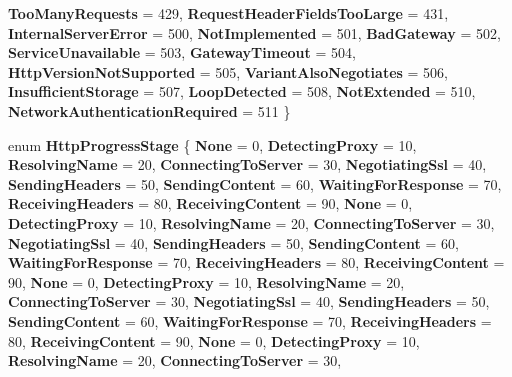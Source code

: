 \begin{DoxyCompactItemize}
{\bfseries Too\+Many\+Requests} = 429, 
{\bfseries Request\+Header\+Fields\+Too\+Large} = 431, 
{\bfseries Internal\+Server\+Error} = 500, 
\newline
{\bfseries Not\+Implemented} = 501, 
{\bfseries Bad\+Gateway} = 502, 
{\bfseries Service\+Unavailable} = 503, 
{\bfseries Gateway\+Timeout} = 504, 
\newline
{\bfseries Http\+Version\+Not\+Supported} = 505, 
{\bfseries Variant\+Also\+Negotiates} = 506, 
{\bfseries Insufficient\+Storage} = 507, 
{\bfseries Loop\+Detected} = 508, 
\newline
{\bfseries Not\+Extended} = 510, 
{\bfseries Network\+Authentication\+Required} = 511
 \}
\item 
\mbox{\label{namespace_windows_1_1_web_1_1_http_aa0f55350f3367ec69564a41407e44b3b}} 
enum {\bfseries Http\+Progress\+Stage} \{ \newline
{\bfseries None} = 0, 
{\bfseries Detecting\+Proxy} = 10, 
{\bfseries Resolving\+Name} = 20, 
{\bfseries Connecting\+To\+Server} = 30, 
\newline
{\bfseries Negotiating\+Ssl} = 40, 
{\bfseries Sending\+Headers} = 50, 
{\bfseries Sending\+Content} = 60, 
{\bfseries Waiting\+For\+Response} = 70, 
\newline
{\bfseries Receiving\+Headers} = 80, 
{\bfseries Receiving\+Content} = 90, 
{\bfseries None} = 0, 
{\bfseries Detecting\+Proxy} = 10, 
\newline
{\bfseries Resolving\+Name} = 20, 
{\bfseries Connecting\+To\+Server} = 30, 
{\bfseries Negotiating\+Ssl} = 40, 
{\bfseries Sending\+Headers} = 50, 
\newline
{\bfseries Sending\+Content} = 60, 
{\bfseries Waiting\+For\+Response} = 70, 
{\bfseries Receiving\+Headers} = 80, 
{\bfseries Receiving\+Content} = 90, 
\newline
{\bfseries None} = 0, 
{\bfseries Detecting\+Proxy} = 10, 
{\bfseries Resolving\+Name} = 20, 
{\bfseries Connecting\+To\+Server} = 30, 
\newline
{\bfseries Negotiating\+Ssl} = 40, 
{\bfseries Sending\+Headers} = 50, 
{\bfseries Sending\+Content} = 60, 
{\bfseries Waiting\+For\+Response} = 70, 
\newline
{\bfseries Receiving\+Headers} = 80, 
{\bfseries Receiving\+Content} = 90, 
{\bfseries None} = 0, 
{\bfseries Detecting\+Proxy} = 10, 
\newline
{\bfseries Resolving\+Name} = 20, 
{\bfseries Connecting\+To\+Server} = 30, 

\end{DoxyCompactItemize}
